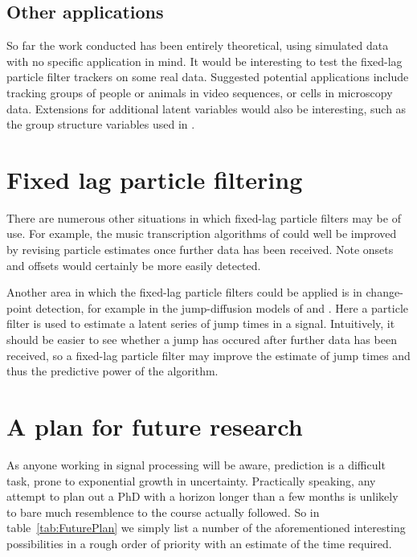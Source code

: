 \subsection{Other applications}
So far the work conducted has been entirely theoretical, using simulated data with no specific application in mind. It would be interesting to test the fixed-lag particle filter trackers on some real data. Suggested potential applications include tracking groups of people or animals in video sequences, or cells in microscopy data. Extensions for additional latent variables would also be interesting, such as the group structure variables used in \cite{Pang2011}.



\section{Fixed lag particle filtering}
There are numerous other situations in which fixed-lag particle filters may be of use. For example, the music transcription algorithms of \cite{Bunch2010} could well be improved by revising particle estimates once further data has been received. Note onsets and offsets would certainly be more easily detected.

Another area in which the fixed-lag particle filters could be applied is in change-point detection, for example in the jump-diffusion models of \cite{Godsill2007a} and \cite{Christensen2012}. Here a particle filter is used to estimate a latent series of jump times in a signal. Intuitively, it should be easier to see whether a jump has occured after further data has been received, so a fixed-lag particle filter may improve the estimate of jump times and thus the predictive power of the algorithm.



\section{A plan for future research}
As anyone working in signal processing will be aware, prediction is a difficult task, prone to exponential growth in uncertainty. Practically speaking, any attempt to plan out a PhD with a horizon longer than a few months is unlikely to bare much resemblence to the course actually followed. So in table~\ref{tab:FuturePlan} we simply list a number of the aforementioned interesting possibilities in a rough order of priority with an estimate of the time required.

